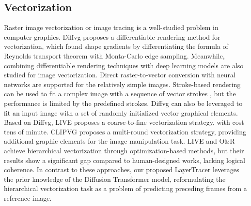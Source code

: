 \subsection{Vectorization}
Raster image vectorization or image tracing is a well-studied problem in computer graphics\cite{svg1, svg2, svg3, svg4}. Diffvg\cite{diffvg} proposes a differentiable rendering method for vectorization, which found shape gradients by differentiating the formula of Reynolds transport theorem with Monta-Carlo edge sampling. Meanwhile, combining differentiable rendering techniques with deep learning models are also studied for image vectorization\cite{live, clipasso, cliptexture}. Direct raster-to-vector conversion with neural networks are supported for the relatively simple images\cite{svg+vae, svg2, im2vec}.  Stroke-based rendering can be used to fit a complex image with a sequence of vector strokes \cite{singh2022intelli, liu2021paint, hu2023stroke}, but the performance is limited by the predefined strokes. Diffvg\cite{diffvg} can also be leveraged to fit an input image with a set of randomly initialized vector graphical elements. Based on Diffvg, LIVE \cite{live} proposes a coarse-to-fine vectorization strategy, with cost tens of minute. CLIPVG\cite{clipvg} proposes a multi-round vectorization strategy,  providing additional graphic elements for the image manipulation task. LIVE \cite{live} and O\&R \cite{oar} achieve hierarchical vectorization through optimization-based methods, but their results show a significant gap compared to human-designed works, lacking logical coherence. In contrast to these approaches, our proposed LayerTracer leverages the prior knowledge of the Diffusion Transformer model, reformulating the hierarchical vectorization task as a problem of predicting preceding frames from a reference image.

